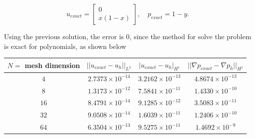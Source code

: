 \documentclass[11pt,a4paper,titlepage]{report}
\begin{document}
\[
u_{exact} = \left[ \begin{array}{c} 0 \\ x(1-x) \end{array} \right], \quad 
p_{exact} = 1-y.
\]

Using the previous solution, the error is 0, since the method for solve the problem is exact for polynomials, as shown below


\begin{center}
\begin{tabular}{| c | c | c | c |}
\hline
$N = $ mesh dimension & $|| u_{exact} - u_h ||_{L^2}$ & $ | u_{exact} - u_h |_{H^1}$ & $|| \nabla p_{exact} - \nabla p_h ||_{H^1} $ \\
\hline
$ 4 $ & $2.7373 \times 10^{-14}$ & $3.2162 \times 10^{-13}$ & $4.8674 \times 10^{-13}$ \\
\hline
$ 8$ & $1.3173  \times 10^{-12}$ & $7.5841 \times 10^{-11}$ & $1.4330 \times 10^{-10}$ \\
\hline
$ 16 $ & $ 8.4791 \times 10^{-14}$ & $9.1285 \times 10^{-12}$ & $3.5083 \times 10^{-11}$\\
\hline
$ 32$ & $9.0508 \times 10^{-14}$ & $1.6039 \times 10^{-11}$ & $1.2406 \times 10^{-10}$ \\
\hline
$ 64$ & $6.3504 \times 10^{-13}$ & $9.5275 \times 10^{-11}$ & $1.4692 \times 10^{-9}$\\
\hline
\end{tabular}
\end{center}
\end{document}
